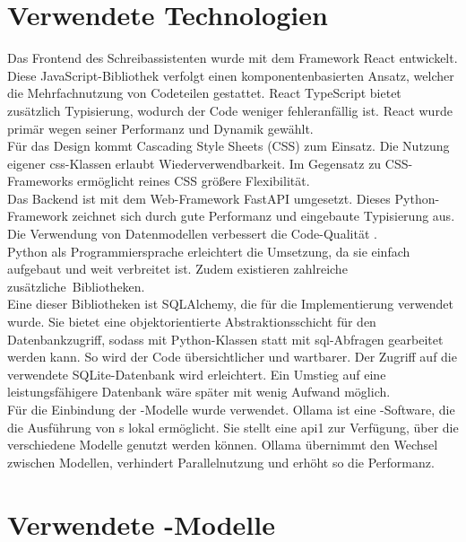 \documentclass[../main.tex]{subfiles}
\begin{document}
\section{Verwendete Technologien}

Das Frontend des Schreibassistenten wurde mit dem Framework React entwickelt. Diese JavaScript-Bibliothek verfolgt einen komponentenbasierten Ansatz, welcher die Mehrfachnutzung 
von Codeteilen gestattet. React TypeScript bietet zusätzlich Typisierung, wodurch der Code weniger fehleranfällig ist. React wurde primär wegen seiner Performanz und Dynamik gewählt. \cite{react1,react2} \\
Für das Design kommt Cascading Style Sheets (CSS) zum Einsatz. Die Nutzung eigener \acrshort{css}-Klassen erlaubt Wiederverwendbarkeit. Im Gegensatz zu CSS-Frameworks ermöglicht reines CSS größere Flexibilität.\\
Das Backend ist mit dem Web-Framework FastAPI umgesetzt. Dieses Python-Framework zeichnet sich durch gute Performanz und eingebaute Typisierung aus. Die Verwendung von Datenmodellen verbessert die Code-Qualität \cite{fastapi}.\\
Python als Programmiersprache erleichtert die Umsetzung, da sie einfach aufgebaut und weit verbreitet ist. Zudem existieren zahlreiche \mbox{zusätzliche Bibliotheken. \cite{python}}\\
Eine dieser Bibliotheken ist SQLAlchemy, die für die Implementierung verwendet wurde. Sie bietet eine objektorientierte Abstraktionsschicht für den Datenbankzugriff, sodass mit Python-Klassen statt mit \acrshort{sql}-Abfragen gearbeitet werden kann. 
So wird der Code übersichtlicher und wartbarer. Der Zugriff auf die verwendete SQLite-Datenbank wird erleichtert. Ein Umstieg auf eine leistungsfähigere Datenbank wäre später mit wenig Aufwand möglich. \cite{SQLAlchemy}\\
Für die Einbindung der -Modelle wurde  verwendet. Ollama ist eine -Software, die die Ausführung von s lokal ermöglicht. 
Sie stellt eine \acrshort{api1} zur Verfügung, über die verschiedene Modelle genutzt werden können. Ollama übernimmt den Wechsel zwischen Modellen, verhindert Parallelnutzung und erhöht so die Performanz. \cite{ollamaSchreibassi,ollamaTechnologie}



\section{Verwendete -Modelle} \label{sec:kiModelle}
\end{document}
